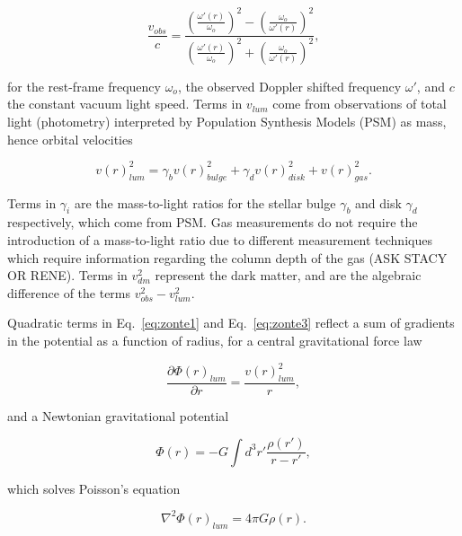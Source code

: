 \documentclass[reprint,%
 amsmath,amssymb,
 aps,
]{revtex4-1}
\begin{document}
 \begin{equation}
 \frac{v_{obs} }{c}=
\frac{  \left( \frac{\omega'(r)}{\omega_o}\right)^2 -  \left( \frac{\omega_o}{\omega'(r)} \right)^2 }{  \left( \frac{\omega'(r)}{\omega_o}\right)^2  +  \left( \frac{\omega_o}{\omega'(r)}\right)^2 },
\label{eq:modelLumA}
\end{equation} 

 for    
 the rest-frame frequency $\omega_o$, the  observed  Doppler shifted frequency $\omega'$, and $c$  the constant vacuum light speed.  
 Terms in  $v_{lum}$ come from observations of total light  (photometry) interpreted by Population Synthesis Models (PSM) as mass,   hence orbital velocities  
  
   \begin{equation}
v(r)_{lum}^2 = \gamma_b v(r)_{bulge}^2 +  \gamma_d v(r)_{disk}^2 + v(r)_{gas}^2.    
\label{eq:zonte3}
\end{equation} 
  
 Terms in    $\gamma_i$  are the mass-to-light ratios for the stellar bulge $\gamma_b$ and disk $\gamma_d$ respectively, which come from PSM. Gas measurements do not require the introduction of a mass-to-light ratio due to different measurement techniques which   require information regarding the column depth of the gas (ASK STACY OR RENE).  
 Terms in $v^2_{dm}$ represent
the dark matter, and  are  the algebraic difference of the   terms  $v^2_{obs}-v^2_{lum}$. 

  Quadratic terms in  Eq.~\ref{eq:zonte1} and Eq.~\ref{eq:zonte3}  reflect a   sum of gradients in the potential as a function of  radius, 
 for a central gravitational    force law   

\begin{equation}
 \frac{\partial \Phi(r)_{lum}}{\partial r}    =\frac{v(r)_{lum}^2}{r},  
    \label{zoochance1}
\end{equation}

  
   
and a  Newtonian gravitational potential 

\begin{equation}
      \Phi(r)  = -G \int d^3r'  \frac{ \rho(r') }{r-r'} ,
      \label{eq:Newt}
      \end{equation}

which solves Poisson's equation

\begin{equation}
\nabla^2 \Phi(r)_{lum}  = 4\pi G \rho(r).   
    \label{whatsgood}
\end{equation}
\end{document}
